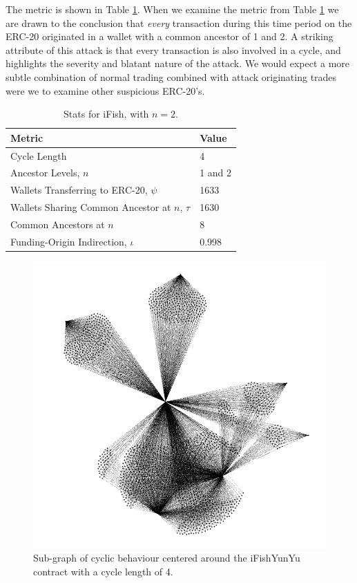 \documentclass[conference]{IEEEtran}
\begin{document}
The metric is shown in Table \ref{tab:ifish4hop}. When we examine the metric from Table \ref{tab:ifish4hop} we are drawn to the conclusion that \emph{every} transaction during this time period on the ERC-20 originated in a wallet with a common ancestor of 1 and 2.  A striking attribute of this attack is that every transaction is also involved in a cycle, and highlights the severity and blatant nature of the attack.  We would expect a more subtle combination of normal trading combined with attack originating trades were we to examine other suspicious ERC-20's.
    

\begin{table}[]
    \centering
\begin{tabular}{|l|l|}
\hline
\textbf{Metric}                & \textbf{Value} \\ \hline
Cycle Length             & 4              \\ \hline
Ancestor Levels, $n$            & 1 and 2          \\ \hline
Wallets Transferring to ERC-20, $\psi$ & 1633              \\ \hline
Wallets Sharing Common Ancestor at $n$, $\tau$            & 1630           \\ \hline
Common Ancestors at $n$            & 8           \\ \hline
Funding-Origin Indirection, $\iota$            & 0.998          \\ \hline
\end{tabular}
    \caption{Stats for iFish, with $n=2$.}
    \label{tab:ifish4hop}
\end{table}



\begin{figure}
    \centering
    \includegraphics[width=0.8\columnwidth]{images/ifishattack.png}
    \caption{Sub-graph of cyclic behaviour centered around the iFishYunYu contract with a cycle length of 4.}
    \label{fig:lifecycle}
\end{figure}
\end{document}
